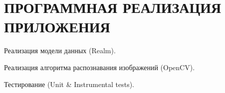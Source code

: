 \section[Программная реализация приложения]{%
  ПРОГРАММНАЯ РЕАЛИЗАЦИЯ ПРИЛОЖЕНИЯ
}

Реализация  модели данных (Realm).

Реализация алгоритма распознавания изображений (OpenCV).

Тестирование (Unit \& Instrumental tests).